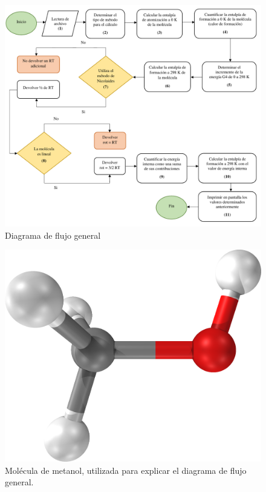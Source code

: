 \begin{figure}[hbtp]
\begin{center}
\includegraphics[width=\textwidth]{graphs/diagrama-flujo}
\caption{Diagrama de flujo general}
\label{diagrama-flujo}
\end{center}
\end{figure}


\begin{figure}[hbtp]
\begin{center}
\includegraphics[scale=0.1]{graphs/metanol.png}
\caption{Molécula de metanol, utilizada para explicar el diagrama de flujo general.}
\label{metanol}
\end{center}
\end{figure}

